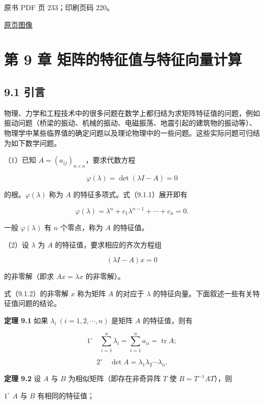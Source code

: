 \clearpage

原书 PDF 页 233；印刷页码 220。

\href{source-images/pdf-233.jpeg}{原页图像}

\section{第 9 章 矩阵的特征值与特征向量计算}\label{ch09a-ux7b2c-9-ux7ae0-ux77e9ux9635ux7684ux7279ux5f81ux503cux4e0eux7279ux5f81ux5411ux91cfux8ba1ux7b97}

\subsection{9.1 引言}\label{ch09a-ux5f15ux8a00}

物理、力学和工程技术中的很多问题在数学上都归结为求矩阵特征值的问题，例如振动问题（桥梁的振动、机械的振动、电磁振荡、地震引起的建筑物的振动等）、物理学中某些临界值的确定问题以及理论物理中的一些问题。这些实际问题可归结为如下数学问题。

（1）已知 \(A=(a_{ij})_{n\times n}\)，要求代数方程

\[
\varphi(\lambda)=\det(\lambda I-A)=0
\tag{9.1.1}
\]

的根。\(\varphi(\lambda)\) 称为 \(A\) 的特征多项式。式（9.1.1）展开即有

\[
\varphi(\lambda)=\lambda^n+c_1\lambda^{n-1}+\cdots+c_n=0.
\]

一般 \(\varphi(\lambda)\) 有 \(n\) 个零点，称为 \(A\) 的特征值。

（2）设 \(\lambda\) 为 \(A\) 的特征值，要求相应的齐次方程组

\[
(\lambda I-A)x=0
\tag{9.1.2}
\]

的非零解（即求 \(Ax=\lambda x\) 的非零解）。

式（9.1.2）的非零解 \(x\) 称为矩阵 \(A\) 的对应于 \(\lambda\) 的特征向量。下面叙述一些有关特征值问题的结论。

\textbf{定理 9.1} 如果 \(\lambda_i\ (i=1,2,\cdots,n)\) 是矩阵 \(A\) 的特征值，则有

\[
1^\circ\quad \sum_{i=1}^n\lambda_i=\sum_{i=1}^na_{ii}=\operatorname{tr}A;
\]

\[
2^\circ\quad \det A=\lambda_1\lambda_2\cdots\lambda_n.
\]

\textbf{定理 9.2} 设 \(A\) 与 \(B\) 为相似矩阵（即存在非奇异阵 \(T\) 使 \(B=T^{-1}AT\)），则

\(1^\circ\) \(A\) 与 \(B\) 有相同的特征值；

